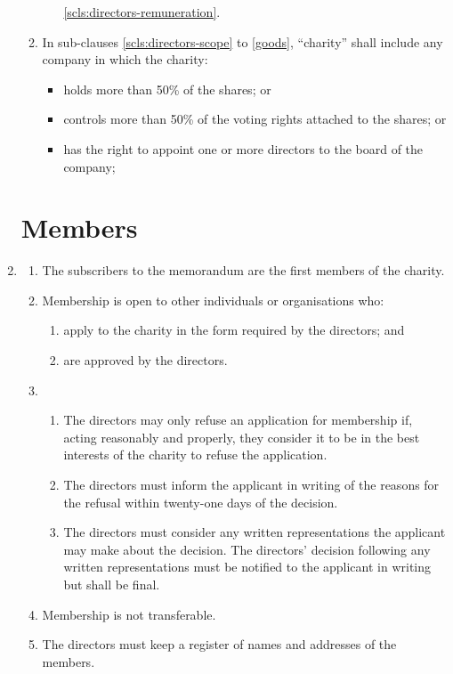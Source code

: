 \begin{enumerate}
\begin{enumerate}
\begin{enumerate}
      \ref{scls:directors-remuneration}.
    \end{enumerate}
  \item \label{def-charity}
    In sub-clauses \ref{scls:directors-scope} to \ref{goods}, ``charity'' shall include
    any company in which the charity:
    \begin{itemize}
    \item
      holds more than 50\% of the shares; or
    \item
      controls more than 50\% of the voting rights attached to the
      shares; or
    \item
      has the right to appoint one or more directors to the board of the
      company;
    \end{itemize}
  \end{enumerate}

\section{Members}

\item
  \label{cls:subscribers}
  \begin{enumerate}
  \item
    The subscribers to the memorandum are the first members of the
    charity.
  \item
    Membership is open to other individuals or organisations who:
    \begin{enumerate}
    \item
      apply to the charity in the form required by the directors; and
    \item
      are approved by the directors.
    \end{enumerate}
  \item
    

    \begin{enumerate}
    \item
      The directors may only refuse an application for membership if,
      acting reasonably and properly, they consider it to be in the best
      interests of the charity to refuse the application.
    \item
      The directors must inform the applicant in writing of the reasons
      for the refusal within twenty-one days of the decision.
    \item
      The directors must consider any written representations the
      applicant may make about the decision. The directors' decision
      following any written representations must be notified to the
      applicant in writing but shall be final.
    \end{enumerate}
  \item
    Membership is not transferable.
  \item
    The directors must keep a register of names and addresses of the
    members.
  \end{enumerate}


\end{enumerate}
